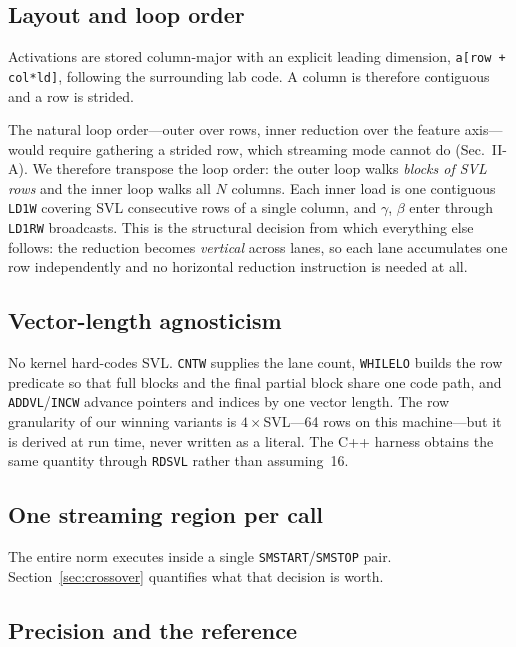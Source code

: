 \documentclass[conference,10pt]{IEEEtran}
\newcommand{\code}[1]{\texttt{\small #1}}
\begin{document}
\subsection{Layout and loop order}

Activations are stored column-major with an explicit leading dimension,
\code{a[row + col*ld]}, following the surrounding lab code. A column is
therefore contiguous and a row is strided.

The natural loop order---outer over rows, inner reduction over the feature
axis---would require gathering a strided row, which streaming mode cannot do
(Sec.~II-A). We therefore transpose the loop order: the outer loop walks
\emph{blocks of SVL rows} and the inner loop walks all $N$ columns. Each inner
load is one contiguous \code{LD1W} covering SVL consecutive rows of a single
column, and $\gamma$, $\beta$ enter through \code{LD1RW} broadcasts. This is the
structural decision from which everything else follows: the reduction becomes
\emph{vertical} across lanes, so each lane accumulates one row independently and
no horizontal reduction instruction is needed at all.

\subsection{Vector-length agnosticism}

No kernel hard-codes SVL. \code{CNTW} supplies the lane count, \code{WHILELO}
builds the row predicate so that full blocks and the final partial block share
one code path, and \code{ADDVL}/\code{INCW} advance pointers and indices by one
vector length. The row granularity of our winning variants is $4\times$SVL---64
rows on this machine---but it is derived at run time, never written as a
literal. The C++ harness obtains the same quantity through \code{RDSVL} rather
than assuming~16.

\subsection{One streaming region per call}

The entire norm executes inside a single \code{SMSTART}/\code{SMSTOP} pair.
Section~\ref{sec:crossover} quantifies what that decision is worth.

\subsection{Precision and the reference}
\end{document}
